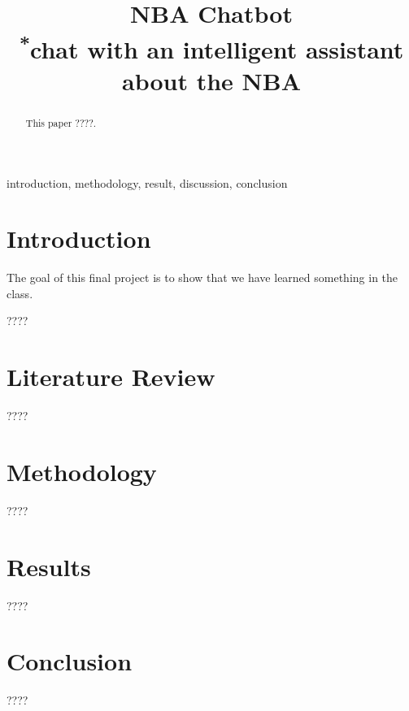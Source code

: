 \documentclass[conference]{IEEEtran}
\begin{document}
\title{NBA Chatbot\\
{\footnotesize \textsuperscript{*}chat with an intelligent assistant about the NBA}
}

\author{
\and
{}
\and
{}
}

\maketitle


\begin{abstract}
This paper ????.
\end{abstract}

\begin{IEEEkeywords}
introduction, methodology, result, discussion, conclusion
\end{IEEEkeywords}


\section{Introduction}
The goal of this final project is to show that we have learned something in the class.

????

\section{Literature Review}
????
\section{Methodology}
????
\section{Results}
????
\section{Conclusion}
????
\end{document}
